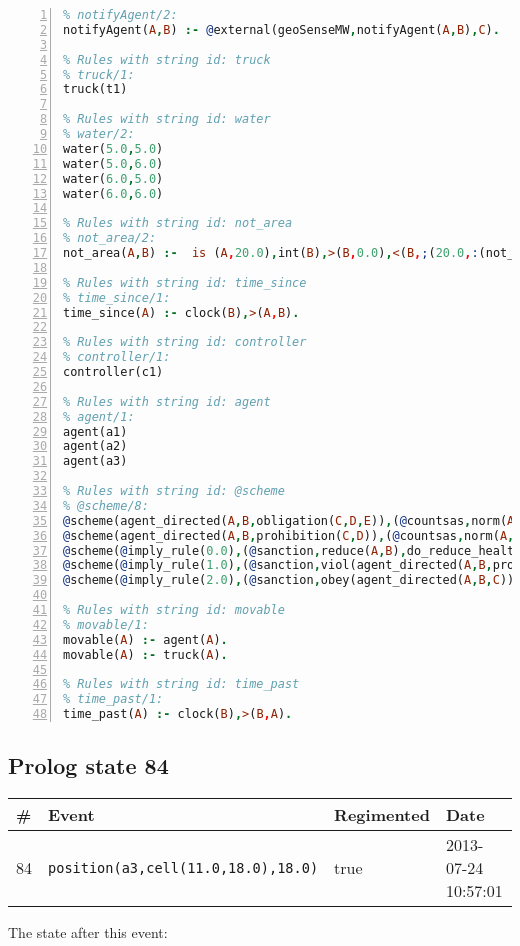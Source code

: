 \documentclass[11pt]{article}\usepackage[utf8]{inputenc}\usepackage{geometry}
\begin{document}
\begin{lstlisting}[language=Prolog, numbers=left]
% Rules with string id: notifyAgent
% notifyAgent/2:
notifyAgent(A,B) :- @external(geoSenseMW,notifyAgent(A,B),C).

% Rules with string id: truck
% truck/1:
truck(t1)

% Rules with string id: water
% water/2:
water(5.0,5.0)
water(5.0,6.0)
water(6.0,5.0)
water(6.0,6.0)

% Rules with string id: not_area
% not_area/2:
not_area(A,B) :-  is (A,20.0),int(B),>(B,0.0),<(B,;(20.0,:(not_area(A,B), is (-(B),20.0)))),int(A),>(A,0.0),<(A,;(20.0,:(area(A,B),-(int(A))))),int(B),>(A,0.0),>(B,0.0),<(A,21.0),<(B,21.0).

% Rules with string id: time_since
% time_since/1:
time_since(A) :- clock(B),>(A,B).

% Rules with string id: controller
% controller/1:
controller(c1)

% Rules with string id: agent
% agent/1:
agent(a1)
agent(a2)
agent(a3)

% Rules with string id: @scheme
% @scheme/8:
@scheme(agent_directed(A,B,obligation(C,D,E)),(@countsas,norm(A,B,F,obligation(C,D,E)),F),false,(listTrue(C)),(time_past(D)),false,[plus(viol(agent_directed(A,B,obligation(C,D,E))))|[]],[plus(obey(agent_directed(A,B,obligation(C,D,E))))|[]])
@scheme(agent_directed(A,B,prohibition(C,D)),(@countsas,norm(A,B,E,prohibition(C,D)),E),(listTrue(C)),false,(false),false,[plus(viol(agent_directed(A,B,prohibition(C,D))))|[]],[plus(obey(agent_directed(A,B,prohibition(C,D))))|[]])
@scheme(@imply_rule(0.0),(@sanction,reduce(A,B),do_reduce_health(A,B),notifyAgent(A,changed(status))),true,false,false,false,[min(reduce(A,B))|[]],[])
@scheme(@imply_rule(1.0),(@sanction,viol(agent_directed(A,B,prohibition(C,D))),do_sanction(D)),true,false,false,false,[min(viol(agent_directed(A,B,prohibition(C,D))))|[]],[])
@scheme(@imply_rule(2.0),(@sanction,obey(agent_directed(A,B,C))),true,false,false,false,[min(obey(agent_directed(A,B,C)))|[]],[])

% Rules with string id: movable
% movable/1:
movable(A) :- agent(A).
movable(A) :- truck(A).

% Rules with string id: time_past
% time_past/1:
time_past(A) :- clock(B),>(B,A).

\end{lstlisting}
\clearpage 
\subsection{Prolog state 84}
\begin{table}[ht]
\centering 
\begin{tabular}{l l l l} 
\textbf{\#} & \textbf{Event} & \textbf{Regimented} & \textbf{Date} \\ [0.5ex] 
\hline
84&\texttt{position(a3,cell(11.0,18.0),18.0)}&true&2013-07-24 10:57:01\\ [1ex] \hline\end{tabular}
\end{table}
The state after this event:
\end{document}
